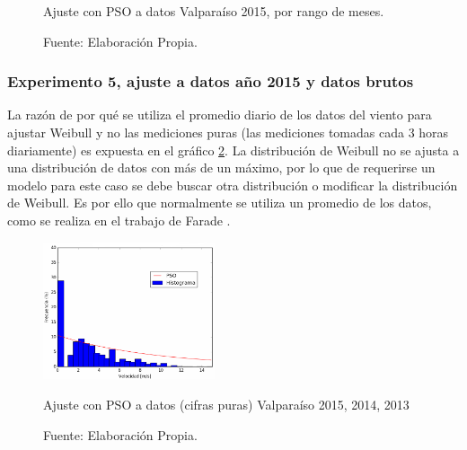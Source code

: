 \begin{figure}[ht!]
{    }%
    \caption{Ajuste con PSO a datos Valparaíso 2015, por rango de meses.}
    \caption*{Fuente: Elaboración Propia.}
    \label{fig:subfigures}
\end{figure}

\subsubsection{Experimento 5, ajuste a datos año 2015 y datos brutos}
La razón de por qué se utiliza el promedio diario de los datos del viento para ajustar Weibull y no las mediciones puras (las mediciones tomadas cada 3 horas diariamente) es expuesta en el gráfico \ref{fig:pso_valpo_15_all_data}. La distribución de Weibull no se ajusta a una distribución de datos con más de un máximo, por lo que de requerirse un modelo para este caso se debe buscar otra distribución o modificar la distribución de Weibull. Es por ello que normalmente se utiliza un promedio de los datos, como se realiza en el trabajo de Farade \cite{Fadare08}.
\begin{figure}[ht!]
    \centering
    \captionsetup{justification=centering,margin=2cm}
    \includegraphics[width=0.45\textwidth]{figures/result_2015_all_data.png}
    \caption{Ajuste con PSO a datos (cifras puras) Valparaíso 2015, 2014, 2013}
    \vspace{-.25cm}
    \caption*{Fuente: Elaboración Propia.}
    \label{fig:pso_valpo_15_all_data}
\end{figure}
\pagebreak
\newpage
